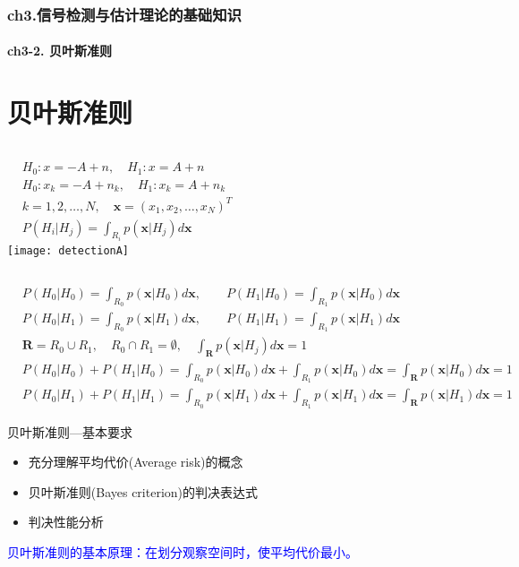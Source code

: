 \begin{frame}[shrink]
  \frametitle{ch3.信号检测与估计理论的基础知识}
  \framesubtitle{ch3-2. 贝叶斯准则}
  \tableofcontents[hideallsubsections]
\end{frame}

\section{贝叶斯准则}

\begin{frame}
\begin{columns}
	\begin{align*}
	&H_0: x=-A+n,\quad H_1: x=A+n\\
	&H_0: x_k=-A+n_k,\quad H_1: x_k=A+n_k\\
	&k=1,2,\dots,N,\quad \bm{x}=(x_1,x_2,\dots,x_N)^{T}\\
	&P(H_i|H_j)=\int_{R_i}p(\bm{x}|H_j)d\bm{x}
	\end{align*}
	\texttt{[image: detectionA]}
\end{columns}
\begin{align*}
&P(H_0|H_0)=\int_{R_0}p(\bm{x}|H_0)d\bm{x},\qquad P(H_1|H_0)=\int_{R_1}p(\bm{x}|H_0)d\bm{x}\\
&P(H_0|H_1)=\int_{R_0}p(\bm{x}|H_1)d\bm{x},\qquad P(H_1|H_1)=\int_{R_1}p(\bm{x}|H_1)d\bm{x}\\
&\bm{R}=R_0\cup R_1,\quad R_0\cap R_1=\emptyset, \quad \int_{\bm{R}}p(\bm{x}|H_j)d\bm{x}=1\\
&P(H_0|H_0)+P(H_1|H_0)=\int_{R_0}p(\bm{x}|H_0)d\bm{x}+\int_{R_1}p(\bm{x}|H_0)d\bm{x}=\int_{\bm{R}}p(\bm{x}|H_0)d\bm{x}=1\\
&P(H_0|H_1)+P(H_1|H_1)=\int_{R_0}p(\bm{x}|H_1)d\bm{x}+\int_{R_1}p(\bm{x}|H_1)d\bm{x}=\int_{\bm{R}}p(\bm{x}|H_1)d\bm{x}=1
\end{align*}
\end{frame}

\begin{frame}{贝叶斯准则---基本要求}
\begin{itemize}
	\item 充分理解平均代价(Average risk)的概念
	\item 贝叶斯准则(Bayes criterion)的判决表达式
	\item 判决性能分析
\end{itemize}

\bigskip
\textcolor{blue}{贝叶斯准则的基本原理：在划分观察空间时，使平均代价最小。}
\end{frame}

